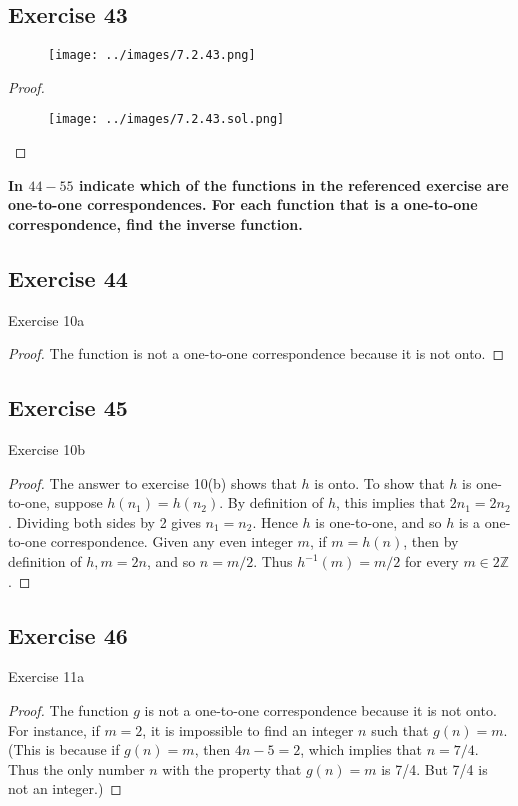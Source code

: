 \documentclass[14pt]{extarticle}
\newcommand{\Z}{\mathbb{Z}}
\newcommand{\cy}{\color{cyan}}
\begin{document}
\subsection{Exercise 43}
\begin{figure}[ht!]
    \centering
    \texttt{[image: ../images/7.2.43.png]}
\end{figure}

\begin{proof}
    \begin{figure}[ht!]
        \centering
        \texttt{[image: ../images/7.2.43.sol.png]}
    \end{figure}
\end{proof}

{\bf \cy In $44-55$ indicate which of the functions in the referenced exercise are one-to-one correspondences. For
each function that is a one-to-one correspondence, find the inverse function.}

\subsection{Exercise 44}
Exercise 10a
\begin{proof}
    The function is not a one-to-one correspondence because it is not onto.
\end{proof}

\subsection{Exercise 45}
Exercise 10b
\begin{proof}
    The answer to exercise 10(b) shows that $h$ is onto. To show that $h$ is one-to-one, suppose \(h(n_1) = h(n_2)\).
    By definition of $h$, this implies that \(2n_1 = 2n_2\). Dividing both sides by 2 gives \(n_1 = n_2\). Hence $h$ is
    one-to-one, and so $h$ is a one-to-one correspondence. Given any even integer $m$, if \(m = h(n)\), then by
    definition of \(h, m = 2n\), and so \(n = m/2\). Thus \(h^{-1}(m) = m/2\) for every \(m \in 2\Z\).
\end{proof}

\subsection{Exercise 46}
Exercise 11a
\begin{proof}
    The function $g$ is not a one-to-one correspondence because it is not onto. For instance, if $m = 2$, it is impossible
    to find an integer $n$ such that \(g(n) = m\). (This is because if \(g(n) = m\), then \(4n - 5 = 2\), which implies
    that \(n = 7/4\). Thus the only number $n$ with the property that \(g(n) = m\) is 7/4. But 7/4 is not an integer.)
\end{proof}
\end{document}
